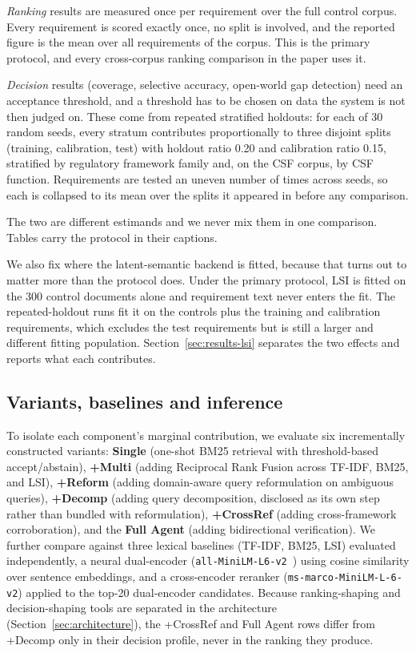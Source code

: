 \documentclass[a4paper,fleqn]{cas-sc}
\begin{document}
\emph{Ranking} results are measured once per requirement over the full control corpus. Every requirement is scored exactly once, no split is involved, and the reported figure is the mean over all requirements of the corpus. This is the primary protocol, and every cross-corpus ranking comparison in the paper uses it.

\emph{Decision} results (coverage, selective accuracy, open-world gap detection) need an acceptance threshold, and a threshold has to be chosen on data the system is not then judged on. These come from repeated stratified holdouts: for each of 30 random seeds, every stratum contributes proportionally to three disjoint splits (training, calibration, test) with holdout ratio 0.20 and calibration ratio 0.15, stratified by regulatory framework family and, on the CSF corpus, by CSF function. Requirements are tested an uneven number of times across seeds, so each is collapsed to its mean over the splits it appeared in before any comparison.

The two are different estimands and we never mix them in one comparison. Tables carry the protocol in their captions.

We also fix where the latent-semantic backend is fitted, because that turns out to matter more than the protocol does. Under the primary protocol, LSI is fitted on the 300 control documents alone and requirement text never enters the fit. The repeated-holdout runs fit it on the controls plus the training and calibration requirements, which excludes the test requirements but is still a larger and different fitting population. Section~\ref{sec:results-lsi} separates the two effects and reports what each contributes.

\subsection{Variants, baselines and inference}

To isolate each component's marginal contribution, we evaluate six incrementally constructed variants: \textbf{Single} (one-shot BM25 retrieval with threshold-based accept/abstain), \textbf{+Multi} (adding Reciprocal Rank Fusion across TF-IDF, BM25, and LSI), \textbf{+Reform} (adding domain-aware query reformulation on ambiguous queries), \textbf{+Decomp} (adding query decomposition, disclosed as its own step rather than bundled with reformulation), \textbf{+CrossRef} (adding cross-framework corroboration), and the \textbf{Full Agent} (adding bidirectional verification).
We further compare against three lexical baselines (TF-IDF, BM25, LSI) evaluated independently, a neural dual-encoder (\texttt{all-MiniLM-L6-v2}~\citep{Reimers2019}) using cosine similarity over sentence embeddings, and a cross-encoder reranker (\texttt{ms-marco-MiniLM-L-6-v2}) applied to the top-20 dual-encoder candidates.
Because ranking-shaping and decision-shaping tools are separated in the architecture (Section~\ref{sec:architecture}), the +CrossRef and Full Agent rows differ from +Decomp only in their decision profile, never in the ranking they produce.
\end{document}
